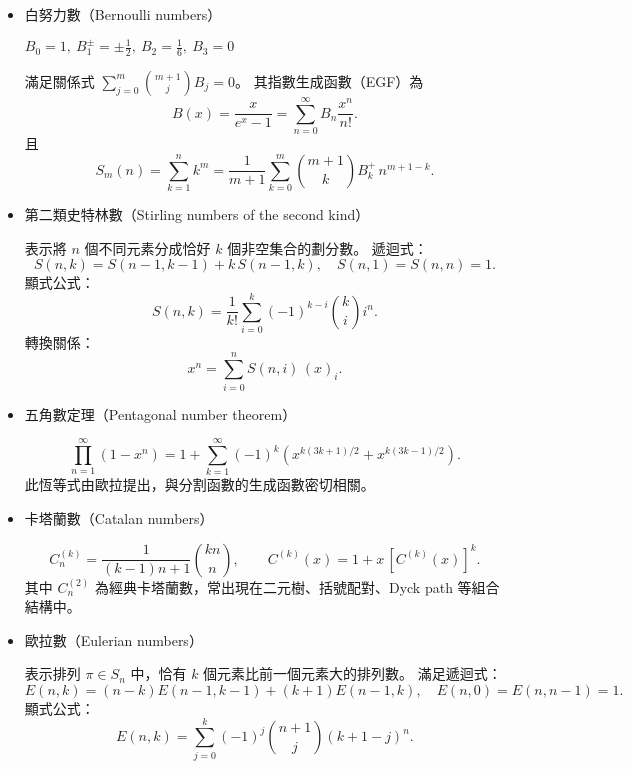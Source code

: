 \begin{itemize}
\item 白努力數（Bernoulli numbers）

$B_0=1,\ B_1^{\pm}=\pm\frac{1}{2},\ B_2=\frac{1}{6},\ B_3=0$

滿足關係式 $\displaystyle\sum_{j=0}^m\binom{m+1}{j}B_j=0$。  
其指數生成函數（EGF）為
\[
B(x)=\frac{x}{e^x-1}=\sum_{n=0}^{\infty}B_n\frac{x^n}{n!}.
\]
且
\[
S_m(n)=\sum_{k=1}^{n}k^m=\frac{1}{m+1}\sum_{k=0}^{m}\binom{m+1}{k}B_k^{+}\,n^{m+1-k}.
\]

\item 第二類史特林數（Stirling numbers of the second kind）

表示將 $n$ 個不同元素分成恰好 $k$ 個非空集合的劃分數。  
遞迴式：
\[
S(n,k)=S(n-1,k-1)+k\,S(n-1,k), \quad S(n,1)=S(n,n)=1.
\]
顯式公式：
\[
S(n,k)=\frac{1}{k!}\sum_{i=0}^{k}(-1)^{k-i}\binom{k}{i}i^n.
\]
轉換關係：
\[
x^n=\sum_{i=0}^{n}S(n,i)\,(x)_i.
\]

\item 五角數定理（Pentagonal number theorem）

\[
\prod_{n=1}^{\infty}(1-x^n)
=1+\sum_{k=1}^{\infty}(-1)^k\!\left(x^{k(3k+1)/2}+x^{k(3k-1)/2}\right).
\]
此恆等式由歐拉提出，與分割函數的生成函數密切相關。

\item 卡塔蘭數（Catalan numbers）

\[
C^{(k)}_n=\frac{1}{(k-1)n+1}\binom{kn}{n},
\qquad
C^{(k)}(x)=1+x\,[C^{(k)}(x)]^k.
\]
其中 $C^{(2)}_n$ 為經典卡塔蘭數，常出現在二元樹、括號配對、Dyck path 等組合結構中。

\item 歐拉數（Eulerian numbers）

表示排列 $\pi\in S_n$ 中，恰有 $k$ 個元素比前一個元素大的排列數。  
滿足遞迴式：
\[
E(n,k)=(n-k)E(n-1,k-1)+(k+1)E(n-1,k),
\quad
E(n,0)=E(n,n-1)=1.
\]
顯式公式：
\[
E(n,k)=\sum_{j=0}^{k}(-1)^j\binom{n+1}{j}(k+1-j)^n.
\]

\end{itemize}

